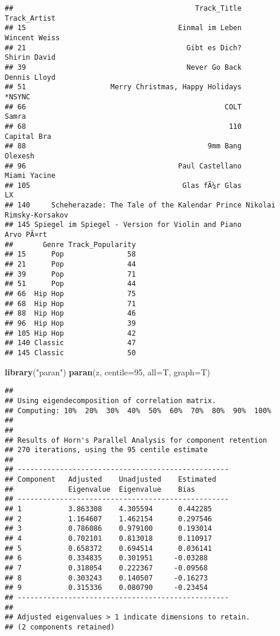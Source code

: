 \documentclass[
]{article}
\newenvironment{Shaded}{\begin{snugshade}}{\end{snugshade}}
\newcommand{\DataTypeTok}[1]{\textcolor[rgb]{0.13,0.29,0.53}{#1}}
\newcommand{\DecValTok}[1]{\textcolor[rgb]{0.00,0.00,0.81}{#1}}
\newcommand{\KeywordTok}[1]{\textcolor[rgb]{0.13,0.29,0.53}{\textbf{#1}}}
\newcommand{\NormalTok}[1]{#1}
\newcommand{\StringTok}[1]{\textcolor[rgb]{0.31,0.60,0.02}{#1}}
\begin{document}
\begin{verbatim}
##                                           Track_Title            Track_Artist
## 15                                    Einmal im Leben           Wincent Weiss
## 21                                      Gibt es Dich?            Shirin David
## 39                                      Never Go Back            Dennis Lloyd
## 51                    Merry Christmas, Happy Holidays                  *NSYNC
## 66                                               COLT                   Samra
## 68                                                110             Capital Bra
## 88                                           9mm Bang                 Olexesh
## 96                                    Paul Castellano            Miami Yacine
## 105                                    Glas fÃ¼r Glas                      LX
## 140     Scheherazade: The Tale of the Kalendar Prince Nikolai Rimsky-Korsakov
## 145 Spiegel im Spiegel - Version for Violin and Piano              Arvo PÃ¤rt
##       Genre Track_Popularity
## 15      Pop               58
## 21      Pop               44
## 39      Pop               71
## 51      Pop               44
## 66  Hip Hop               75
## 68  Hip Hop               71
## 88  Hip Hop               46
## 96  Hip Hop               39
## 105 Hip Hop               42
## 140 Classic               47
## 145 Classic               50
\end{verbatim}

\begin{Shaded}
\begin{Highlighting}[]
\KeywordTok{library}\NormalTok{(}\StringTok{"paran"}\NormalTok{)}
\KeywordTok{paran}\NormalTok{(z, }\DataTypeTok{centile=}\DecValTok{95}\NormalTok{, }\DataTypeTok{all=}\NormalTok{T, }\DataTypeTok{graph=}\NormalTok{T)}
\end{Highlighting}
\end{Shaded}

\begin{verbatim}
## 
## Using eigendecomposition of correlation matrix.
## Computing: 10%  20%  30%  40%  50%  60%  70%  80%  90%  100%
## 
## 
## Results of Horn's Parallel Analysis for component retention
## 270 iterations, using the 95 centile estimate
## 
## -------------------------------------------------- 
## Component   Adjusted    Unadjusted    Estimated 
##             Eigenvalue  Eigenvalue    Bias 
## -------------------------------------------------- 
## 1           3.863308    4.305594      0.442285
## 2           1.164607    1.462154      0.297546
## 3           0.786086    0.979100      0.193014
## 4           0.702101    0.813018      0.110917
## 5           0.658372    0.694514      0.036141
## 6           0.334835    0.301951     -0.03288
## 7           0.318054    0.222367     -0.09568
## 8           0.303243    0.140507     -0.16273
## 9           0.315336    0.080790     -0.23454
## -------------------------------------------------- 
## 
## Adjusted eigenvalues > 1 indicate dimensions to retain.
## (2 components retained)
\end{verbatim}
\end{document}
